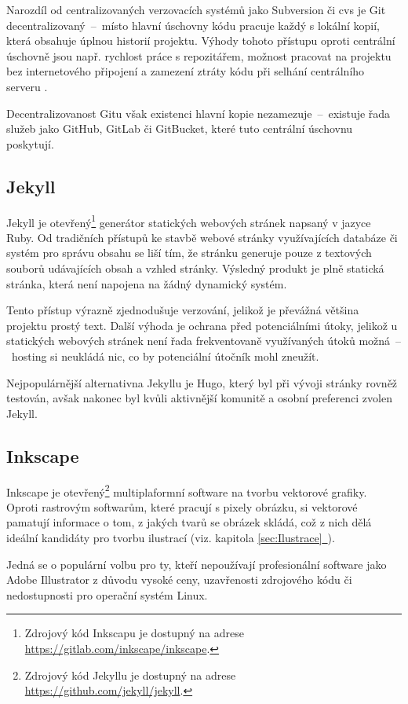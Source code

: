 \documentclass[a4paper, 12pt]{article}
\newcommand*{\fullref}[1]{\hyperref[{#1}]{\ref*{#1}~\nameref*{#1}}}
\begin{document}
  Narozdíl od centralizovaných verzovacích systémů jako Subversion či \gls{cvs} je Git decentralizovaný~--~místo hlavní úschovny kódu pracuje každý s lokální kopií, která obsahuje úplnou historií projektu. Výhody tohoto přístupu oproti centrální úschovně jsou např. rychlost práce s repozitářem, možnost pracovat na projektu bez internetového připojení a zamezení ztráty kódu při selhání centrálního serveru \cite{cvcs-vs-dvcs}.

  Decentralizovanost Gitu však existenci hlavní kopie nezamezuje~--~existuje řada služeb jako GitHub, GitLab či GitBucket, které tuto centrální úschovnu poskytují.


  \subsection{Jekyll} \label{sec:Jekyll}
  Jekyll je otevřený\footnote{Zdrojový kód Inkscapu je dostupný na adrese \url{https://gitlab.com/inkscape/inkscape}.} generátor statických webových stránek napsaný v jazyce Ruby. Od tradičních přístupů ke stavbě webové stránky využívajících databáze či systém pro správu obsahu se liší tím, že stránku generuje pouze z textových souborů udávajících obsah a vzhled stránky. Výsledný produkt je plně statická stránka, která není napojena na žádný dynamický systém.

  Tento přístup výrazně zjednodušuje verzování, jelikož je převážná většina projektu prostý text. Další výhoda je ochrana před potenciálními útoky, jelikož u statických webových stránek není řada frekventovaně využívaných útoků možná~--~hosting si neukládá nic, co by potenciální útočník mohl zneužít.

  Nejpopulárnější alternativna Jekyllu je Hugo, který byl při vývoji stránky rovněž testován, avšak nakonec byl kvůli aktivnější komunitě a osobní preferenci zvolen Jekyll.


  \subsection{Inkscape} \label{sec:Inkscape}
  Inkscape je otevřený\footnote{Zdrojový kód Jekyllu je dostupný na adrese \url{https://github.com/jekyll/jekyll}.} multiplaformní software na tvorbu vektorové grafiky. Oproti rastrovým softwarům, které pracují s  pixely obrázku, si vektorové pamatují informace o tom, z jakých tvarů se obrázek skládá, což z nich dělá ideální kandidáty pro tvorbu ilustrací (viz. kapitola \fullref{sec:Ilustrace}).

  Jedná se o populární volbu pro ty, kteří nepoužívají profesionální software jako Adobe Illustrator z důvodu vysoké ceny, uzavřenosti zdrojového kódu či nedostupnosti pro operační systém Linux.
\end{document}
